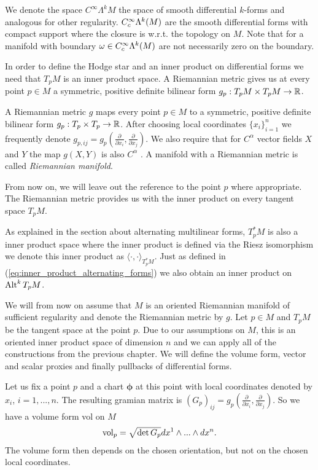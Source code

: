 \documentclass[../master_thesis.tex]{subfiles}
\begin{document}
We denote the space $C^\infty \Lambda^k M$ the 
space of smooth differential $k$-forms and analogous for other regularity.
$C_c^\infty \Lambda^{k}(M)$ are the smooth differential forms
with compact support where the closure is w.r.t. 
the topology on $M$. Note that for a manifold with boundary 
$\omega \in C_c^\infty \Lambda^{k}(M)$ are not necessarily zero on the boundary.

In order to define the Hodge star and an inner product on differential forms
we need that 
$T_p M$ is an inner product space.
A Riemannian metric gives us at every point $p \in M$ 
a symmetric, positive definite bilinear form 
$g_p: T_p M \times T_p M \rightarrow \mathbb{R}$. 
\begin{definition}
    A Riemannian metric $g$ maps every point $p\in M$ to 
    a symmetric, positive definite bilinear form $g_p: T_p \times T_p \rightarrow \mathbb{R}$.
    After choosing local coordinates $\{x_i\}_{i=1}^n$ we frequently denote 
    $g_{p,ij} = g_p(\frac{\partial}{\partial x_i}, \frac{\partial}{\partial x_j})$.
    We also require that for $C^\alpha$ vector fields $X$ and $Y$ the map 
    $g(X,Y)$ is also $C^\alpha$ . 
    A manifold with a Riemannian metric is called 
    \textit{Riemannian manifold}.
\end{definition}
From now on, we will leave out the reference to the point $p$ where appropriate.
The Riemannian metric provides us with the 
inner product on every tangent space $T_p M$. 

As explained in the section about alternating multilinear forms, $T^*_p M$ is also a 
inner product space where the inner product is defined via the Riesz isomorphism
we denote this inner product as $\langle \cdot, \cdot \rangle _{T^*_p M}$.
Just as defined in (\ref{eq:inner_product_alternating_forms}) 
we also obtain an inner product on 
${\text{Alt}^{k}\,T_p M}$.

We will from now on assume that $M$ is an oriented Riemannian manifold of sufficient 
regularity and denote the Riemannian metric by $g$.
Let $p \in M$ and $T_p M$ be the tangent space at the point $p$. 
Due to our assumptions on $M$, this is an oriented inner product space of 
dimension $n$ and we can apply 
all of the constructions from the previous chapter. 
We will define the volume form, vector and scalar proxies and finally pullbacks
of differential forms.

Let us fix a point $p$ and a chart $\boldsymbol{\phi}$ 
at this point with local coordinates denoted by $x_i$, $i=1,...,n$. 
The resulting gramian matrix is
$(G_p)_{ij} = g_p(\frac{\partial}{\partial x_i},\frac{\partial}{\partial x_j})$.
So we have a volume form vol on $M$ 
\begin{align*}
    \operatorname{vol}_p = \sqrt{\det G_p} dx^1 \wedge ... \wedge dx^n.
\end{align*}
The volume form then depends on the chosen orientation, but not on the 
chosen local coordinates.
\end{document}
